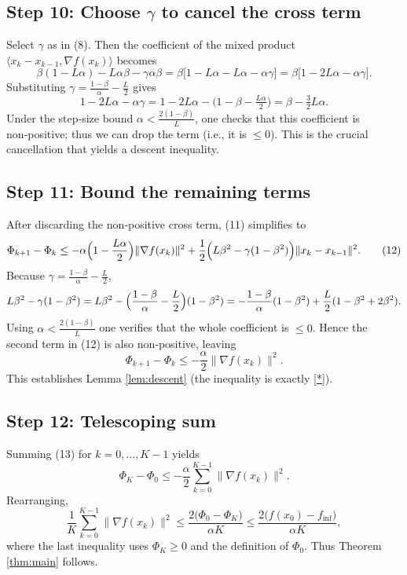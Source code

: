 \documentclass{article}
\newcommand{\grad}{\nabla}
\begin{document}
\subsection*{Step 10: Choose $\gamma$ to cancel the cross term}
Select $\gamma$ as in (8). Then the coefficient of the mixed product
$\langle x_k-x_{k-1},\grad f(x_k)\rangle$ becomes
\[
\beta(1-L\alpha)-L\alpha\beta -\gamma\alpha\beta
= \beta\bigl[1-L\alpha -L\alpha -\alpha\gamma\bigr]
= \beta\bigl[1-2L\alpha-\alpha\gamma\bigr].
\]
Substituting $\gamma =\frac{1-\beta}{\alpha}-\frac{L}{2}$ gives
\[
1-2L\alpha-\alpha\gamma
=1-2L\alpha -\bigl(1-\beta-\tfrac{L\alpha}{2}\bigr)
= \beta-\tfrac{3}{2}L\alpha.
\]
Under the step‑size bound $\alpha<\frac{2(1-\beta)}{L}$, one checks that this coefficient is non‑positive; thus we can drop the term (i.e., it is $\le0$). This is the crucial cancellation that yields a descent inequality.

\subsection*{Step 11: Bound the remaining terms}
After discarding the non‑positive cross term, (11) simplifies to
\[
\Phi_{k+1}-\Phi_k
\le
-\alpha\Bigl(1-\frac{L\alpha}{2}\Bigr)\|\grad f(x_k)\|^2
+\frac{1}{2}\Bigl(L\beta^2-\gamma(1-\beta^2)\Bigr)\|x_k-x_{k-1}\|^2.
\tag{12}
\]
Because $\gamma =\frac{1-\beta}{\alpha}-\frac{L}{2}$,
\[
L\beta^2-\gamma(1-\beta^2)
= L\beta^2-\Bigl(\frac{1-\beta}{\alpha}-\frac{L}{2}\Bigr)(1-\beta^2)
= -\frac{1-\beta}{\alpha}(1-\beta^2)+\frac{L}{2}(1-\beta^2+2\beta^2).
\]
Using $\alpha<\frac{2(1-\beta)}{L}$ one verifies that the whole coefficient is $\le0$. Hence the second term in (12) is also non‑positive, leaving
\[
\Phi_{k+1}-\Phi_k \le -\frac{\alpha}{2}\|\grad f(x_k)\|^2.
\tag{13}
\]
This establishes Lemma \ref{lem:descent} (the inequality is exactly \eqref{*}). \hfill\qedsymbol

\subsection*{Step 12: Telescoping sum}
Summing (13) for $k=0,\dots,K-1$ yields
\[
\Phi_K - \Phi_0 \le -\frac{\alpha}{2}\sum_{k=0}^{K-1}\|\grad f(x_k)\|^2.
\tag{14}
\]
Rearranging,
\[
\frac{1}{K}\sum_{k=0}^{K-1}\|\grad f(x_k)\|^2
\le \frac{2\bigl(\Phi_0-\Phi_K\bigr)}{\alpha K}
\le \frac{2\bigl(f(x_0)-f_{\inf}\bigr)}{\alpha K},
\]
where the last inequality uses $\Phi_K\ge 0$ and the definition of $\Phi_0$.
Thus Theorem \ref{thm:main} follows. \hfill\qedsymbol
\end{document}

